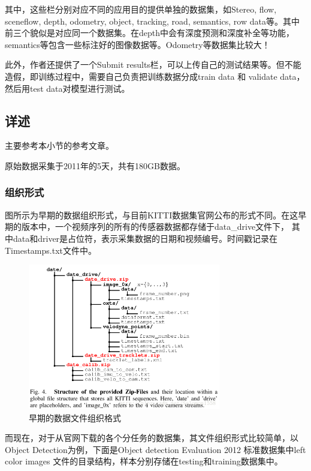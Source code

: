 其中，这些栏分别对应不同的应用目的提供单独的数据集，如Stereo, flow, sceneflow, depth, odometry, object, tracking, road, semantics, row data等。其中前三个貌似是对应同一个数据集。在depth中会有深度预测和深度补全等功能，semantics等包含一些标注好的图像数据等。Odometry等数据集比较大！

此外，作者还提供了一个Submit results栏，可以上传自己的测试结果等。但不能造假，即训练过程中，需要自己负责把训练数据分成train data 和 validate data， 然后用test data对模型进行测试。

\subsection{详述}

主要参考本小节的参考文章。

原始数据采集于2011年的5天，共有180GB数据。 

\subsubsection{组织形式}

图所示为早期的数据组织形式，与目前KITTI数据集官网公布的形式不同。在这早期的版本中，一个视频序列的所有的传感器数据都存储于data\_drive文件下， 其中data和driver是占位符，表示采集数据的日期和视频编号。时间戳记录在Timestamps.txt文件中。

\begin{figure}[!hbtp]
\centering
\includegraphics[width=0.75\textwidth]{SemanticSLAM/KITTI1.png}
\caption{早期的数据文件组织格式}
\label{KITTI1}
\end{figure}

而现在，对于从官网下载的各个分任务的数据集，其文件组织形式比较简单，以Object Detection为例，下面是Object detection Evaluation 2012 标准数据集中left color images 文件的目录结构，样本分别存储在testing和training数据集中。

